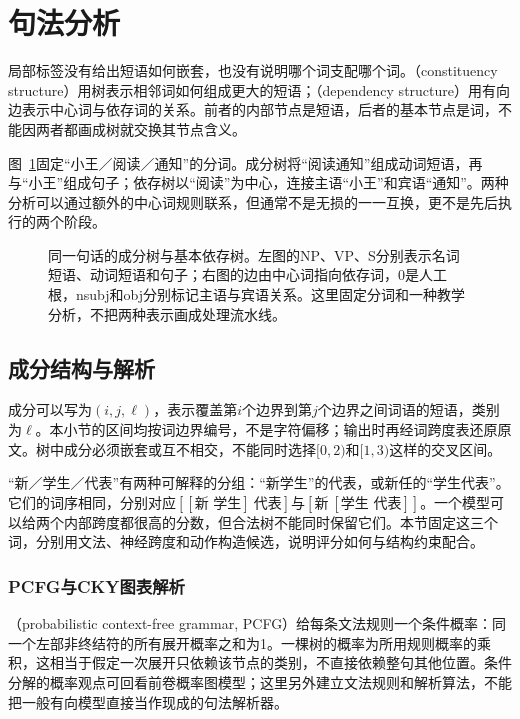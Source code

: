 \section{句法分析}
\label{sec:nlp-analysis-syntax}

局部标签没有给出短语如何嵌套，也没有说明哪个词支配哪个词。（constituency structure）用树表示相邻词如何组成更大的短语；（dependency structure）用有向边表示中心词与依存词的关系。前者的内部节点是短语，后者的基本节点是词，不能因两者都画成树就交换其节点含义。

图~\ref{fig:nlp-analysis-syntax}固定“小王／阅读／通知”的分词。成分树将“阅读通知”组成动词短语，再与“小王”组成句子；依存树以“阅读”为中心，连接主语“小王”和宾语“通知”。两种分析可以通过额外的中心词规则联系，但通常不是无损的一一互换，更不是先后执行的两个阶段。

\begin{figure}[htbp]
  \centering
  
  \caption{同一句话的成分树与基本依存树。左图的NP、VP、S分别表示名词短语、动词短语和句子；右图的边由中心词指向依存词，0是人工根，nsubj和obj分别标记主语与宾语关系。这里固定分词和一种教学分析，不把两种表示画成处理流水线。}
  \label{fig:nlp-analysis-syntax}
\end{figure}

\subsection{成分结构与解析}
\label{sec:nlp-analysis-constituency}

成分可以写为$(i,j,\ell)$，表示覆盖第$i$个边界到第$j$个边界之间词语的短语，类别为$\ell$。本小节的区间均按词边界编号，不是字符偏移；输出时再经词跨度表还原原文。树中成分必须嵌套或互不相交，不能同时选择$[0,2)$和$[1,3)$这样的交叉区间。

“新／学生／代表”有两种可解释的分组：“新学生”的代表，或新任的“学生代表”。它们的词序相同，分别对应$[[\text{新 学生}]\ \text{代表}]$与$[\text{新}\ [\text{学生 代表}]]$。一个模型可以给两个内部跨度都很高的分数，但合法树不能同时保留它们。本节固定这三个词，分别用文法、神经跨度和动作构造候选，说明评分如何与结构约束配合。

\subsubsection{PCFG与CKY图表解析}
\label{sec:nlp-analysis-pcfg-cky}

（probabilistic context-free grammar, PCFG）给每条文法规则一个条件概率：同一个左部非终结符的所有展开概率之和为1。一棵树的概率为所用规则概率的乘积，这相当于假定一次展开只依赖该节点的类别，不直接依赖整句其他位置。条件分解的概率观点可回看前卷概率图模型；这里另外建立文法规则和解析算法，不能把一般有向模型直接当作现成的句法解析器。

